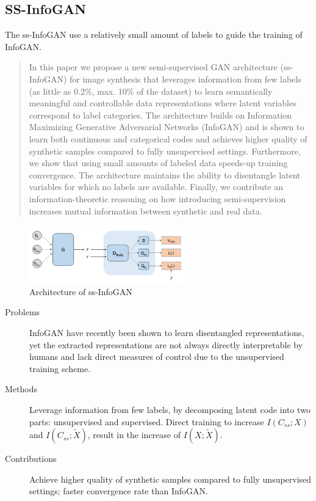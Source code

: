 \documentclass[12pt]{utils/mydoc}
\begin{document}
\subsection{SS-InfoGAN}

The ss-InfoGAN\cite{spurr2017guiding} use a relatively small amount of labels to guide the 
training of InfoGAN.

\begin{abstract}
  In this paper we propose a new semi-supervised GAN architecture
  (ss-InfoGAN) for image synthesis that leverages information from few labels (as
  little as 0.2\%, max. 10\% of the dataset) to learn semantically meaningful and
  controllable data representations where latent variables correspond to label 
  categories. The architecture builds on Information Maximizing Generative 
  Adversarial Networks (InfoGAN) and is shown to learn both continuous and 
  categorical codes and achieves higher quality of synthetic samples compared to
  fully unsupervised settings. Furthermore, we show that using small amounts of 
  labeled data speeds-up training convergence. The architecture maintains the 
  ability to disentangle latent variables for which no labels are available. 
  Finally, we contribute an information-theoretic reasoning on how introducing 
  semi-supervision increases mutual information between synthetic and real data.  
\end{abstract}

\begin{figure}[hpb!]
  \centering
  \includegraphics[width=0.6\textwidth]{figss/ss-infogan.png}
  \caption{Architecture of ss-InfoGAN}
  \label{fig:}
\end{figure}

\begin{description}
  \item[Problems] InfoGAN\cite{Chen2016InfoGAN} have recently been shown to learn disentangled
    representations, yet the extracted representations are not always directly interpretable
    by humans and lack direct measures of control due to the unsupervised training scheme.
  \item[Methods] Leverage information from few labels, by decomposing latent code into two parts:
    unsupervised and supervised. Direct training to increase $I(C_{ss}; X)$ and 
    $I(C_{ss}; \tilde{X})$, result in the increase of $I(X; \tilde{X})$.
  \item[Contributions] Achieve higher quality of synthetic samples compared to fully unsupervised
    settings; faster convergence rate than InfoGAN.
\end{description}
\end{document}
